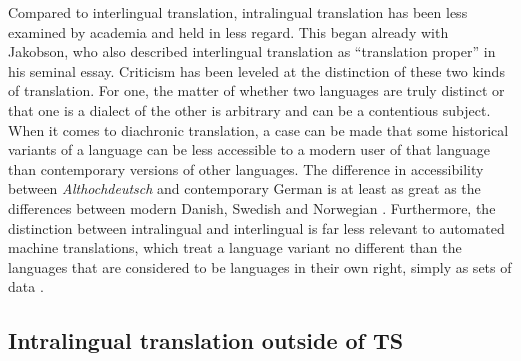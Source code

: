 \begin{paper}
Compared to interlingual translation, intralingual translation has been
less examined by academia and held in less regard. This began already
with Jakobson, who also described interlingual translation as
``translation proper'' in his seminal essay. Criticism has been leveled
at the distinction of these two kinds of translation. For one, the
matter of whether two languages are truly distinct or that one is a
dialect of the other is arbitrary and can be a contentious subject. When
it comes to diachronic translation, a case can be made that some
historical variants of a language can be less accessible to a modern
user of that language than contemporary versions of other languages. The
difference in accessibility between \emph{Althochdeutsch} and
contemporary German is at least as great as the differences between
modern Danish, Swedish and Norwegian \citep[25--27]{schreiber_ubersetzung_1993}.
Furthermore, the distinction between intralingual and interlingual is
far less relevant to automated machine translations, which treat a
language variant no different than the languages that are considered to
be languages in their own right, simply as sets of data \citep[64]{shardlow_survey_2014}.

\subsection{Intralingual translation outside of
TS}


\end{paper}
